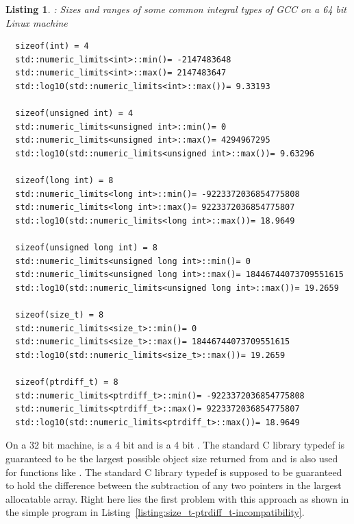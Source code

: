 \documentclass[pdf,ps2pdf,11pt]{SANDreport}
\newtheorem{listing}{Listing}
\begin{document}
{}\begin{listing}: Sizes and ranges of some common integral types of
GCC on a 64 bit Linux machine
\label{listing:integral-type-sizes}
{\small\begin{verbatim}
  sizeof(int) = 4
  std::numeric_limits<int>::min()= -2147483648
  std::numeric_limits<int>::max()= 2147483647
  std::log10(std::numeric_limits<int>::max())= 9.33193
  
  sizeof(unsigned int) = 4
  std::numeric_limits<unsigned int>::min()= 0
  std::numeric_limits<unsigned int>::max()= 4294967295
  std::log10(std::numeric_limits<unsigned int>::max())= 9.63296
  
  sizeof(long int) = 8
  std::numeric_limits<long int>::min()= -9223372036854775808
  std::numeric_limits<long int>::max()= 9223372036854775807
  std::log10(std::numeric_limits<long int>::max())= 18.9649
  
  sizeof(unsigned long int) = 8
  std::numeric_limits<unsigned long int>::min()= 0
  std::numeric_limits<unsigned long int>::max()= 18446744073709551615
  std::log10(std::numeric_limits<unsigned long int>::max())= 19.2659
  
  sizeof(size_t) = 8
  std::numeric_limits<size_t>::min()= 0
  std::numeric_limits<size_t>::max()= 18446744073709551615
  std::log10(std::numeric_limits<size_t>::max())= 19.2659
  
  sizeof(ptrdiff_t) = 8
  std::numeric_limits<ptrdiff_t>::min()= -9223372036854775808
  std::numeric_limits<ptrdiff_t>::max()= 9223372036854775807
  std::log10(std::numeric_limits<ptrdiff_t>::max())= 18.9649
\end{verbatim}}
\end{listing}


On a 32 bit machine, {} is a 4 bit {}
and {} is a 4 bit {}.  The standard C library
typedef {} is guaranteed to be the largest possible
object size returned from {} and is also used for
functions like {}.  The standard C library typedef
{} is supposed to be guaranteed to hold the difference
between the subtraction of any two pointers in the largest allocatable
array.  Right here lies the first problem with this approach as shown
in the simple program in
Listing~\ref{listing:size_t-ptrdiff_t-incompatibility}.
\end{document}
